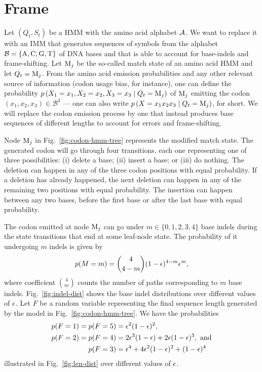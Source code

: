 \section{Frame}

Let $(Q_t, S_t)$ be a HMM with the amino acid alphabet $\mathcal{A}$. We want to replace it with an IMM
that generates sequences of symbols from the alphabet $\mathcal{B} = \{\mathrm{A}, \mathrm{C}, \mathrm{G},
\mathrm{T}\}$ of DNA bases and that is able to account for base-indels and frame-shifting. Let
$\mathrm{M}_j$ be the so-called match state of an amino acid HMM and let $Q_t=\mathrm{M}_j$. From the
amino acid emission probabilities and any other relevant source of information (codon usage bias,
for instance), one can define the probability $p\left(X_1=x_1, X_2=x_2, X_3=x_3\;\middle|\; Q_t=\mathrm{M}_j\right)$
of $\mathrm{M}_j$ emitting the codon $(x_1, x_2, x_3) \in \mathcal B^3$ --- one can also write
$p\left(X=x_1x_2x_3\;\middle|\; Q_t=\mathrm{M}_j\right)$, for short. We will replace the codon emission process by one
that instead produces base sequences of different lengths to account for errors and frame-shifting.

Node $\mathrm{M}_j$ in Fig.~\ref{fig:codon-hmm-tree} represents the modified match state.
The generated codon will go through four transitions, each one representing one of three possibilities: (i) delete a base; (ii) insert a base; or (iii) do nothing.
The deletion can happen in any of the three codon positions with equal probability.
If a deletion has already happened, the next deletion can happen in any of the remaining two positions with equal probability.
The insertion can happen between any two bases, before the first base or after the last base with equal probability.

The codon emitted at node $\mathrm{M}_j$ can go under $m\in\{0, 1, 2, 3, 4\}$ base indels during
the state transitions that end at some leaf-node state.
The probability of it undergoing $m$ indels is given by
\begin{equation*}
  p(M=m) = \binom{4}{4-m} (1 - \epsilon)^{4-m} \epsilon^m,
\end{equation*}
where coefficient $\binom{4}{m}$ counts the number of paths corresponding to $m$ base indels.
Fig.~\ref{fig:indel-dist} shows the base indel distributions over different values of $\epsilon$.
Let $F$ be a random variable representing the final sequence length generated by the model in
Fig.~\ref{fig:codon-hmm-tree}.
We have the probabilities
\begin{equation*}
  \begin{split}
    p(F=1) = p(F=5) &= \epsilon^2(1-\epsilon)^2, \\
    p(F=2) = p(F=4) &= 2\epsilon^3(1-\epsilon) + 2\epsilon(1-\epsilon)^3,~\text{and} \\
    p(F=3)          &= \epsilon^4 + 4\epsilon^2(1-\epsilon)^2 + (1-\epsilon)^4
  \end{split}
\end{equation*}
illustrated in Fig.~\ref{fig:len-dist} over different values of $\epsilon$.

